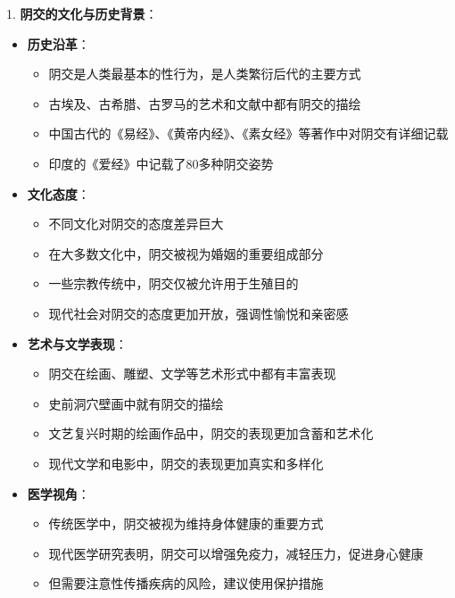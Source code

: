\documentclass[12pt,UTF8]{ctexbook}
\begin{document}
1. \textbf{阴交的文化与历史背景}：
\begin{itemize}
	\item \textbf{历史沿革}：
	\begin{itemize}
		\item 阴交是人类最基本的性行为，是人类繁衍后代的主要方式
		\item 古埃及、古希腊、古罗马的艺术和文献中都有阴交的描绘
		\item 中国古代的《易经》、《黄帝内经》、《素女经》等著作中对阴交有详细记载
		\item 印度的《爱经》中记载了80多种阴交姿势
	\end{itemize}
	\item \textbf{文化态度}：
	\begin{itemize}
		\item 不同文化对阴交的态度差异巨大
		\item 在大多数文化中，阴交被视为婚姻的重要组成部分
		\item 一些宗教传统中，阴交仅被允许用于生殖目的
		\item 现代社会对阴交的态度更加开放，强调性愉悦和亲密感
	\end{itemize}
	\item \textbf{艺术与文学表现}：
	\begin{itemize}
		\item 阴交在绘画、雕塑、文学等艺术形式中都有丰富表现
		\item 史前洞穴壁画中就有阴交的描绘
		\item 文艺复兴时期的绘画作品中，阴交的表现更加含蓄和艺术化
		\item 现代文学和电影中，阴交的表现更加真实和多样化
	\end{itemize}
	\item \textbf{医学视角}：
	\begin{itemize}
		\item 传统医学中，阴交被视为维持身体健康的重要方式
		\item 现代医学研究表明，阴交可以增强免疫力，减轻压力，促进身心健康
		\item 但需要注意性传播疾病的风险，建议使用保护措施
	\end{itemize}
\end{itemize}
\end{document}

